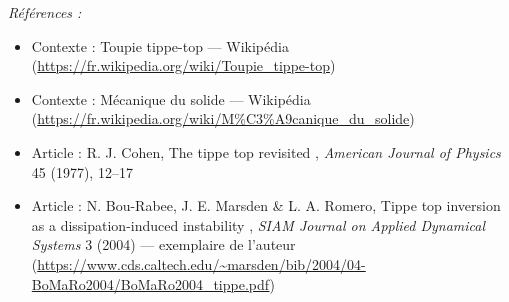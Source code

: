 \documentclass[11pt]{article}
\newenvironment{refs}{\par\small\noindent\emph{Références :}\begin{itemize}\setlength\itemsep{0pt}}{\end{itemize}\normalsize}
\begin{document}
\begin{refs}
\item Contexte : Toupie tippe-top --- Wikipédia (\url{https://fr.wikipedia.org/wiki/Toupie_tippe-top})
\item Contexte : Mécanique du solide --- Wikipédia (\url{https://fr.wikipedia.org/wiki/M%C3%A9canique_du_solide})
\item Article : R. J. Cohen, \og{} The tippe top revisited \fg{}, \textit{American Journal of Physics} 45 (1977), 12--17
\item Article : N. Bou-Rabee, J. E. Marsden \& L. A. Romero, \og{} Tippe top inversion as a dissipation-induced instability \fg{}, \textit{SIAM Journal on Applied Dynamical Systems} 3 (2004) --- exemplaire de l'auteur (\url{https://www.cds.caltech.edu/~marsden/bib/2004/04-BoMaRo2004/BoMaRo2004_tippe.pdf})
\end{refs}

\bigskip
\end{document}
